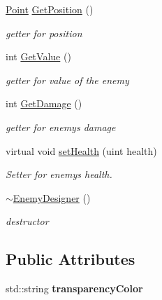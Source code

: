 \begin{DoxyCompactItemize}
\mbox{\hyperlink{class_point}{Point}} \mbox{\hyperlink{class_enemy_designer_a3ed8aa13f9da30df073e729ea4817dfe}{Get\+Position}} ()
\begin{DoxyCompactList}\small\item\em getter for position \end{DoxyCompactList}\item 
int \mbox{\hyperlink{class_enemy_designer_aa1982407303eb55be476281c5b7a40f8}{Get\+Value}} ()
\begin{DoxyCompactList}\small\item\em getter for value of the enemy \end{DoxyCompactList}\item 
int \mbox{\hyperlink{class_enemy_designer_a6c612e70cef0534946c54f302f63a970}{Get\+Damage}} ()
\begin{DoxyCompactList}\small\item\em getter for enemy\textquotesingle{}s damage \end{DoxyCompactList}\item 
virtual void \mbox{\hyperlink{class_enemy_designer_afaed42dca9d945456c780c55a6c16b84}{set\+Health}} (uint health)
\begin{DoxyCompactList}\small\item\em Setter for enemy\textquotesingle{}s health. \end{DoxyCompactList}\item 
\mbox{\label{class_enemy_designer_ac7938c26b4e2f54b511c1e18cdacb97b}} 
\mbox{\hyperlink{class_enemy_designer_ac7938c26b4e2f54b511c1e18cdacb97b}{$\sim$\+Enemy\+Designer}} ()
\begin{DoxyCompactList}\small\item\em destructor \end{DoxyCompactList}\end{DoxyCompactItemize}
\subsection*{Public Attributes}
\begin{DoxyCompactItemize}
\item 
\mbox{\label{class_enemy_designer_af003889b786feb80d2330115959a2530}} 
std\+::string {\bfseries transparency\+Color}
\end{DoxyCompactItemize}
